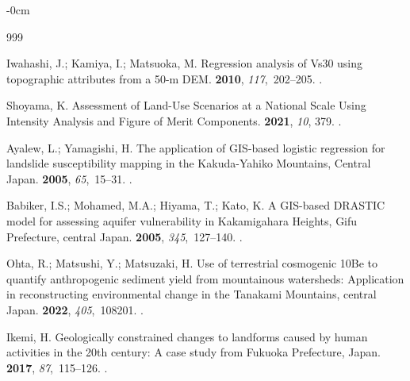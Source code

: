 \documentclass[land,article,accept,pdftex,moreauthors]{Definitions/mdpi}
\begin{document}
\begin{adjustwidth}{-\extralength}{0cm}


\begin{thebibliography}{999}

Iwahashi, J.; Kamiya, I.; Matsuoka, M.
\newblock Regression analysis of Vs30 using topographic attributes from a 50-m
  DEM.
 {\bf 2010}, {\em 117},~202--205.
.

Shoyama, K.
\newblock Assessment of Land-Use Scenarios at a National Scale Using Intensity
  Analysis and Figure of Merit Components.
 {\bf 2021}, {\em 10}, 379.
.

Ayalew, L.; Yamagishi, H.
\newblock The application of GIS-based logistic regression for landslide
  susceptibility mapping in the Kakuda-Yahiko Mountains, Central Japan.
 {\bf 2005}, {\em 65},~15--31.
.

Babiker, I.S.; Mohamed, M.A.; Hiyama, T.; Kato, K.
\newblock A GIS-based DRASTIC model for assessing aquifer vulnerability in
  Kakamigahara Heights, Gifu Prefecture, central Japan.
 {\bf 2005}, {\em
  345},~127--140.
.

Ohta, R.; Matsushi, Y.; Matsuzaki, H.
\newblock Use of terrestrial cosmogenic 10Be to quantify anthropogenic sediment
  yield from mountainous watersheds: Application in reconstructing
  environmental change in the Tanakami Mountains, central Japan.
 {\bf 2022}, {\em 405},~108201.
.

Ikemi, H.
\newblock Geologically constrained changes to landforms caused by human
  activities in the 20th century: A case study from Fukuoka Prefecture, Japan.
 {\bf 2017}, {\em 87},~115--126.
.


\end{thebibliography}
\end{adjustwidth}
\end{document}
